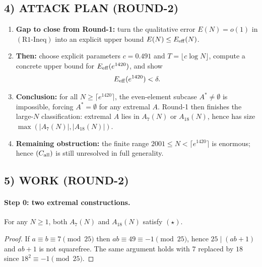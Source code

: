 \subsection*{4) ATTACK PLAN (ROUND-2)}
\begin{enumerate}
\item \textbf{Gap to close from Round-1:} turn the qualitative error $E(N)=o(1)$ in $(\text{R1-Ineq})$ into an explicit upper bound $E(N)\le E_{\rm eff}(N)$.
\item \textbf{Then:} choose explicit parameters $c=0.491$ and $T=\lfloor c\log N\rfloor$, compute a concrete upper bound for $E_{\rm eff}(e^{1420})$, and show
\[
E_{\rm eff}(e^{1420})<\delta.
\]
\item \textbf{Conclusion:} for all $N\ge \lceil e^{1420}\rceil$, the even-element subcase $A^\ast\neq\emptyset$ is impossible, forcing $A^\ast=\emptyset$ for any extremal $A$.  Round-1 then finishes the large-$N$ classification: extremal $A$ lies in $A_7(N)$ or $A_{18}(N)$, hence has size $\max(|A_7(N)|,|A_{18}(N)|)$.
\item \textbf{Remaining obstruction:} the finite range $2001\le N <\lceil e^{1420}\rceil$ is enormous; hence $(C_{\rm all})$ is still unresolved in full generality.
\end{enumerate}

\subsection*{5) WORK (ROUND-2)}

\paragraph{Step 0: two extremal constructions.}
\begin{lemma}\label{lem:A7works}
For any $N\ge 1$, both $A_7(N)$ and $A_{18}(N)$ satisfy $(\star)$.
\end{lemma}
\begin{proof}
If $a\equiv b\equiv 7\pmod{25}$ then $ab\equiv 49\equiv -1\pmod{25}$, hence $25\mid (ab+1)$ and $ab+1$ is not squarefree.  The same argument holds with $7$ replaced by $18$ since $18^2\equiv -1\pmod{25}$.
\end{proof}

